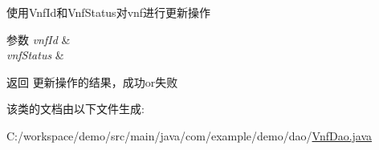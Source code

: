 使用\+Vnf\+Id和\+Vnf\+Status对vnf进行更新操作 
\begin{DoxyParams}{参数}
{\em vnf\+Id} & \\
\hline
{\em vnf\+Status} & \\
\hline
\end{DoxyParams}
\begin{DoxyReturn}{返回}
更新操作的结果，成功or失败 
\end{DoxyReturn}


该类的文档由以下文件生成\+:\begin{DoxyCompactItemize}
\item 
C\+:/workspace/demo/src/main/java/com/example/demo/dao/\mbox{\hyperlink{_vnf_dao_8java}{Vnf\+Dao.\+java}}\end{DoxyCompactItemize}
